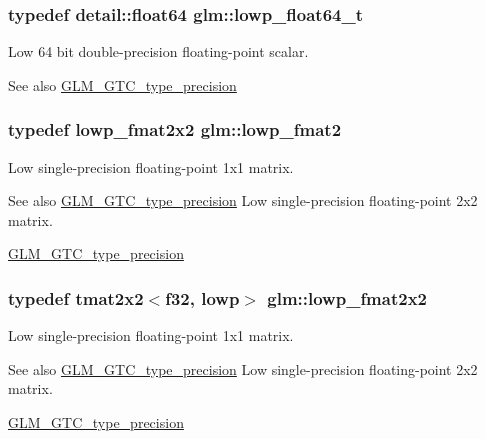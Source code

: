 \subsubsection[{lowp\+\_\+float64\+\_\+t}]{\setlength{\rightskip}{0pt plus 5cm}typedef detail\+::float64 {\bf glm\+::lowp\+\_\+float64\+\_\+t}}\label{namespaceglm_ac9d64f4e69d6c2eade41a848077866b5}
Low 64 bit double-\/precision floating-\/point scalar. \begin{DoxySeeAlso}{See also}
\hyperlink{group__gtc__type__precision}{G\+L\+M\+\_\+\+G\+T\+C\+\_\+type\+\_\+precision} 
\end{DoxySeeAlso}
\hypertarget{namespaceglm_a9bafb192cb7327d543ad55be2e6e675c}{}
\subsubsection[{lowp\+\_\+fmat2}]{\setlength{\rightskip}{0pt plus 5cm}typedef {\bf lowp\+\_\+fmat2x2} {\bf glm\+::lowp\+\_\+fmat2}}\label{namespaceglm_a9bafb192cb7327d543ad55be2e6e675c}
Low single-\/precision floating-\/point 1x1 matrix. \begin{DoxySeeAlso}{See also}
\hyperlink{group__gtc__type__precision}{G\+L\+M\+\_\+\+G\+T\+C\+\_\+type\+\_\+precision} Low single-\/precision floating-\/point 2x2 matrix. 

\hyperlink{group__gtc__type__precision}{G\+L\+M\+\_\+\+G\+T\+C\+\_\+type\+\_\+precision} 
\end{DoxySeeAlso}
\hypertarget{namespaceglm_aa860329771ca51dbaa48cf16a1ecfc34}{}
\subsubsection[{lowp\+\_\+fmat2x2}]{\setlength{\rightskip}{0pt plus 5cm}typedef tmat2x2$<${\bf f32}, lowp$>$ {\bf glm\+::lowp\+\_\+fmat2x2}}\label{namespaceglm_aa860329771ca51dbaa48cf16a1ecfc34}
Low single-\/precision floating-\/point 1x1 matrix. \begin{DoxySeeAlso}{See also}
\hyperlink{group__gtc__type__precision}{G\+L\+M\+\_\+\+G\+T\+C\+\_\+type\+\_\+precision} Low single-\/precision floating-\/point 2x2 matrix. 

\hyperlink{group__gtc__type__precision}{G\+L\+M\+\_\+\+G\+T\+C\+\_\+type\+\_\+precision} 
\end{DoxySeeAlso}
\hypertarget{namespaceglm_a96419cd63d22eebac48b2529c5954538}{}
